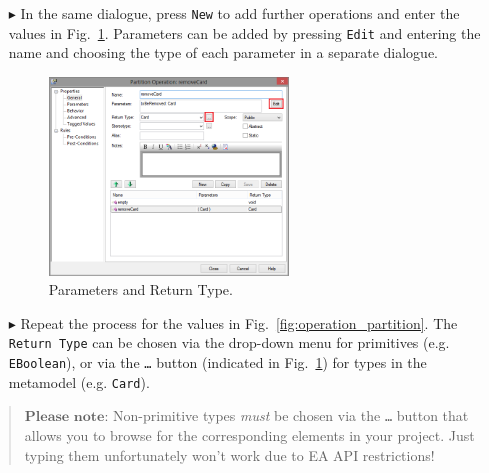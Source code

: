 \begin{enumerate}
\item[$\blacktriangleright$] In the same dialogue, press \texttt{New} to add further operations and enter the values in Fig.~\ref{fig:operation_parameters}.  Parameters can be added by pressing \texttt{Edit} and entering the name and choosing the type of each parameter in a separate dialogue.

\begin{figure}[htbp]
	\centering
  \includegraphics[width=0.6\textwidth]{pics/memBoxBilder/memBox38.png}
	\caption{Parameters and Return Type.}
	\label{fig:operation_parameters}
\end{figure}
\FloatBarrier

\item[$\blacktriangleright$] Repeat the process for the values in Fig.~\ref{fig:operation_partition}.
The \texttt{Return Type} can be chosen via the drop-down menu for primitives (e.g. \texttt{EBoolean}), or via the \texttt{\ldots} button (indicated in Fig.~\ref{fig:operation_parameters}) for types in the metamodel (e.g. \texttt{Card}).
\end{enumerate}

\vspace{-.5cm}
\begin{quote}
$\textbf{Please note:}$ Non-primitive types \emph{must} be chosen via the \texttt{\ldots} button that allows you to browse for the corresponding elements in your project.
Just typing them unfortunately won't work due to EA API restrictions!
\end{quote}
\vspace{-.5cm}

